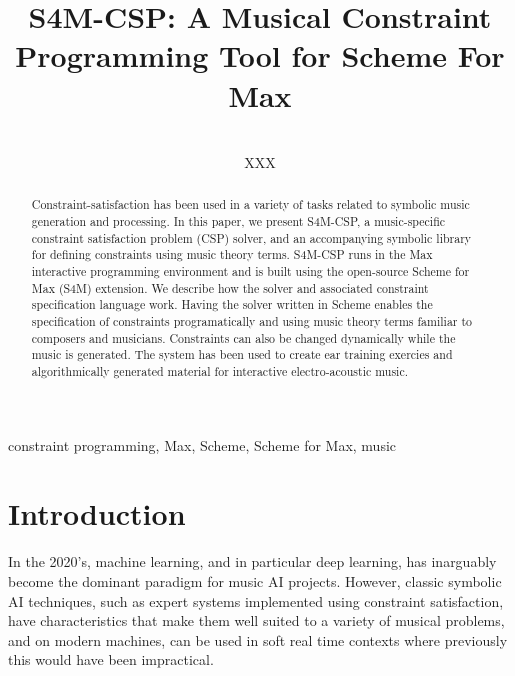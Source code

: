 \documentclass[pmlr]{jmlr}%
\title[S4M-CSP]{S4M-CSP: A Musical Constraint Programming Tool for Scheme For Max}
\author{\Name{Author One\nametag{}} \Email{author1@email}\and
\Name{Author Two} \Email{author2@email}\\
\addr XXX}
\begin{document}
\maketitle

\begin{abstract}

  Constraint-satisfaction has been used in a variety of
  tasks related to symbolic music generation and processing. In this
  paper, we present S4M-CSP, a music-specific constraint satisfaction
  problem (CSP) solver, and an accompanying symbolic library for
  defining constraints using music theory terms. S4M-CSP runs in the
  Max interactive programming environment and is built using the
  open-source Scheme for Max (S4M) extension. We describe how the
  solver and associated constraint specification language work. Having
  the solver written in Scheme enables the specification of
  constraints programatically and using music theory terms familiar to
  composers and musicians. Constraints can also be changed dynamically
  while the music is generated. The system has been used to create ear
  training exercies and algorithmically generated material for
  interactive electro-acoustic music.
  
\end{abstract}
\begin{keywords}
constraint programming, Max, Scheme, Scheme for Max, music
\end{keywords}

\section{Introduction}
\label{sec:intro}


In the 2020's, machine learning, and in particular deep learning, has inarguably become the dominant paradigm
for music AI projects. However, classic symbolic AI techniques, such as expert systems implemented using constraint satisfaction, have 
characteristics that make them well suited to a variety of musical problems,
and on modern machines, can be used in soft real time contexts where previously this would have been impractical.
\end{document}
